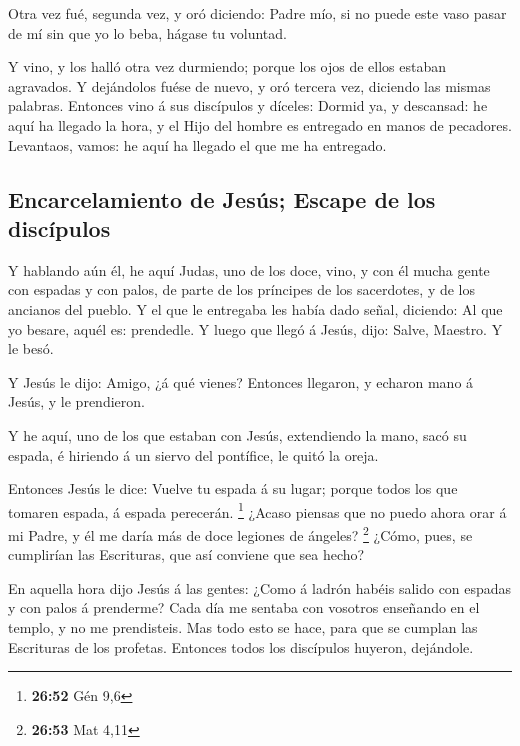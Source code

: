  Otra vez fué, segunda vez, y oró diciendo: Padre mío, si
no puede este vaso pasar de mí sin que yo lo beba, hágase tu voluntad.

 Y vino, y los halló otra vez durmiendo; porque los ojos de
ellos estaban agravados.  Y dejándolos fuése de nuevo, y
oró tercera vez, diciendo las mismas palabras.  Entonces
vino á sus discípulos y díceles: Dormid ya, y descansad: he aquí ha
llegado la hora, y el Hijo del hombre es entregado en manos de
pecadores.  Levantaos, vamos: he aquí ha llegado el que me
ha entregado.

\hypertarget{encarcelamiento-de-jesuxfas-escape-de-los-discuxedpulos}{%
\subsection{Encarcelamiento de Jesús; Escape de los
discípulos}\label{encarcelamiento-de-jesuxfas-escape-de-los-discuxedpulos}}

 Y hablando aún él, he aquí Judas, uno de los doce, vino, y
con él mucha gente con espadas y con palos, de parte de los príncipes de
los sacerdotes, y de los ancianos del pueblo.  Y el que le
entregaba les había dado señal, diciendo: Al que yo besare, aquél es:
prendedle.  Y luego que llegó á Jesús, dijo: Salve,
Maestro. Y le besó.

 Y Jesús le dijo: Amigo, ¿á qué vienes? Entonces llegaron,
y echaron mano á Jesús, y le prendieron.

 Y he aquí, uno de los que estaban con Jesús, extendiendo
la mano, sacó su espada, é hiriendo á un siervo del pontífice, le quitó
la oreja.

 Entonces Jesús le dice: Vuelve tu espada á su lugar;
porque todos los que tomaren espada, á espada perecerán. \footnote{\textbf{26:52}
  Gén 9,6}  ¿Acaso piensas que no puedo ahora orar á mi
Padre, y él me daría más de doce legiones de ángeles? \footnote{\textbf{26:53}
  Mat 4,11}  ¿Cómo, pues, se cumplirían las Escrituras, que
así conviene que sea hecho?

 En aquella hora dijo Jesús á las gentes: ¿Como á ladrón
habéis salido con espadas y con palos á prenderme? Cada día me sentaba
con vosotros enseñando en el templo, y no me prendisteis. 
Mas todo esto se hace, para que se cumplan las Escrituras de los
profetas. Entonces todos los discípulos huyeron, dejándole.

